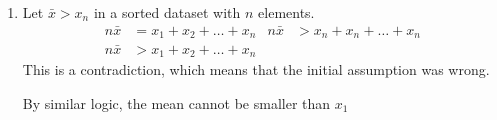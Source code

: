 \begin{enumerate}
    \item Let $ \bar{x} > x_n $ in a sorted dataset with $ n $ elements.
          \begin{align}
              n\bar{x} & = x_1 + x_2 + \dots + x_n &
              n\bar{x} & > x_n + x_n + \dots + x_n   \\
              n\bar{x} & > x_1 + x_2 + \dots + x_n
          \end{align}
          This is a contradiction, which means that the initial assumption was wrong.
          \par By similar logic, the mean cannot be smaller than $ x_1 $
\end{enumerate}